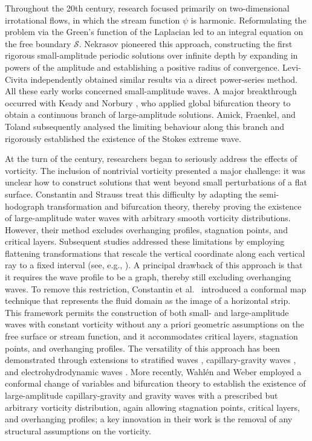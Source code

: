 \documentclass[reqno]{amsart}
\numberwithin{equation}{section}
\numberwithin{equation}{section}
\numberwithin{equation}{section}
\begin{document}
Throughout the 20th century, research focused primarily on two-dimensional irrotational flows, in which the stream function \(\psi\) is harmonic. Reformulating the problem via the Green's function of the Laplacian led to an integral equation on the free boundary \(\mathcal{S}\). Nekrasov \cite{Nekrasov} pioneered this approach, constructing the first rigorous small-amplitude periodic solutions over infinite depth by expanding in powers of the amplitude and establishing a positive radius of convergence. Levi-Civita \cite{LeviC} independently obtained similar results via a direct power-series method. All these early works concerned small-amplitude waves. A major breakthrough occurred with Keady and Norbury \cite{KeadyN}, who applied global bifurcation theory to obtain a continuous branch of large-amplitude solutions. Amick, Fraenkel, and Toland \cite{AmickFT} subsequently analysed the limiting behaviour along this branch and rigorously established the existence of the Stokes extreme wave.

At the turn of the century, researchers began to seriously address the effects of vorticity. The inclusion of nontrivial vorticity presented a major challenge: it was unclear how to construct solutions that went beyond small perturbations of a flat surface. Constantin and Strauss \cite{ConstantinS} treat this difficulty by adapting the semi-hodograph transformation and bifurcation theory, thereby proving the existence of large-amplitude water waves with arbitrary smooth vorticity distributions. However, their method excludes overhanging profiles, stagnation points, and critical layers. Subsequent studies addressed these limitations by employing flattening transformations that rescale the vertical coordinate along each vertical ray to a fixed interval (see, e.g., \cite{DaiXZ, HenryM, Varholm, Wahlen}). A principal drawback of this approach is that it requires the wave profile to be a graph, thereby still excluding overhanging waves. To remove this restriction, Constantin et al.\ \cite{ ConstantinV,ConstantinSV} introduced a conformal map technique that represents the fluid domain as the image of a horizontal strip. This framework permits the construction of both small- and large-amplitude waves with constant vorticity without any a priori geometric assumptions on the free surface or stream function, and it accommodates critical layers, stagnation points, and overhanging profiles. The versatility of this approach has been demonstrated through extensions to stratified waves \cite{Haziot}, capillary-gravity waves \cite{WangXZ}, and electrohydrodynamic waves \cite{DaiFZ}. More recently, Wahl\'en and Weber \cite{WahlenW1, WahlenW2} employed a conformal change of variables and bifurcation theory to establish the existence of large-amplitude capillary-gravity and gravity waves with a prescribed but arbitrary vorticity distribution, again allowing stagnation points, critical layers, and overhanging profiles; a key innovation in their work is the removal of any structural assumptions on the vorticity.
\end{document}
